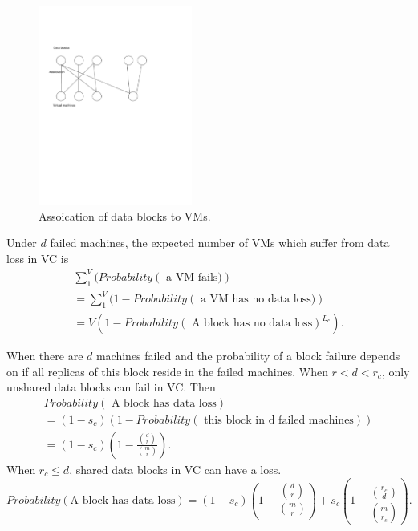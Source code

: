 {\begin{figure}[htbp]
\centering
\includegraphics[width=0.45\textwidth]{shared.pdf}
\caption{Assoication of data blocks to VMs.}
\label{fig:shared}
\end{figure}


Under $d$ failed machines, the  expected number of VMs 
which suffer from data loss in VC is
\begin{multline}
 \sum_{1}^{V}  ( Probability (\mbox{ a VM fails)}) \\
= \sum_{1}^{V}  ( 1- Probability (\mbox{ a VM has no data loss)}) \\
= V ( 1-  Probability(\mbox{ A block has no data loss} )^{L_c} ).
\end{multline}


When there are $d$ machines failed and the probability of
a block failure depends on if all replicas of this block reside in the failed machines.
When $r< d <r_c$,  only unshared data blocks can fail in VC. Then
\begin{multline}
Probability(\mbox{ A block has data loss})\\
= (1-s_c) (1- Probability (\mbox{ this block in d failed machines}))\\
= (1-s_c) (1- \frac{ \binom{d}{r}} { \binom{m}{r} }).
\end{multline}
When $r_c \leq d$, shared data blocks in VC can have a loss. 
\[
Probability(\mbox{A block has data loss})
= 
(1-s_c) (1- \frac{ \binom{d}{r}} { \binom{m}{r} })
+ s_c (1- \frac{ \binom{r_c}{d}} { \binom{m}{r_c} }).
\]

}
